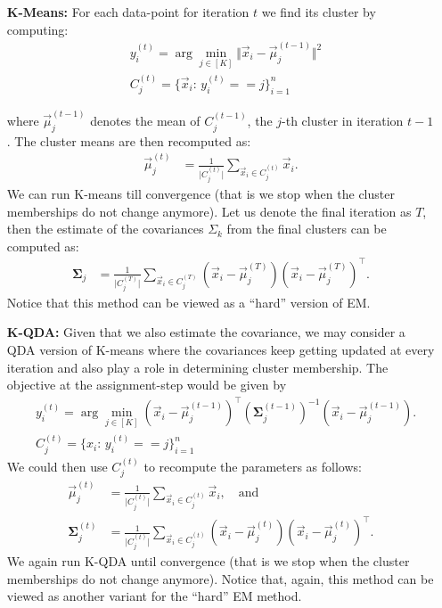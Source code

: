 \documentclass[preview]{standalone}
\begin{document}
\begin{itemize}
  \item[{\bf K-Means:}] For each data-point for iteration $t$ we find its cluster
  by computing:
  \begin{align*}
  	&y_i^{(t)}= \arg\min_{j \in [K]} \Vert \vec x_i -\vec \mu_j^{(t-1)}\Vert^2\\
    &C_j^{(t)} = \{\vec x_i :\, y_i^{(t)}==j\}_{i=1}^n
  \end{align*}

  where $\vec\mu_j^{(t-1)}$ denotes the mean of $C_j^{(t-1)}$, the $j$-th cluster
  in iteration $t-1$.
  The cluster means are then recomputed as:
  \begin{align*}
  	\vec\mu_j^{(t)} &= \frac{1}{\vert C_j^{(t)} \vert}{\sum_{\vec x_i\in C_j^{(t)}}\vec x_i}.
  \end{align*}
  We can run K-means till convergence (that is we stop when the
  cluster memberships do not change anymore).
  Let us denote the final iteration as $T$, then the estimate of the covariances
  $\Sigma_k$ from the final clusters can be computed as:
  \begin{align*}
  	{\bm\Sigma}_j &= \frac{1}{\vert C_j^{(T)} \vert}
    {\sum_{\vec x_i\in C_j^{(T)}}(\vec x_i-\vec \mu_j^{(T)})(\vec x_i-\vec \mu_j^{(T)})^\top}.
  \end{align*}
  Notice that this method can be viewed as a ``hard'' version of
  EM. 
  
  \item[{\bf K-QDA:}] Given that we also estimate the covariance, we
    may consider a QDA version of K-means where the covariances keep
    getting updated at every iteration and also play a role in
    determining cluster membership. The objective at the assignment-step
    would be given by
  \begin{align*}
  		&y_i^{(t)} = \arg\min_{j \in [K]} 	(\vec x_i -\vec \mu_j^{(t-1)})^\top
      ({\bm \Sigma}_j^{(t-1)})^{-1} (\vec x_i -\vec\mu_j^{(t-1)}).\\
      &C_j^{(t)} = \{x_i :\, y_i^{(t)}==j\}_{i=1}^n
  \end{align*}
    We could then  use $C_j^{(t)}$ to recompute the parameters as follows:
  \begin{align*}
  	\vec\mu_j^{(t)} &= \frac{1}{\vert C_j^{(t)} \vert}{\sum_{\vec x_i\in C_j^{(t)}}\vec x_i},\quad\text{and}\\
  	{\bm\Sigma}_j^{(t)} &= \frac{1}{\vert C_j^{(t)} \vert}{\sum_{\vec x_i\in C_j^{(t)}}(\vec x_i-\vec \mu_j^{(t)})(\vec x_i-\vec \mu_j^{(t)})^\top}.
  \end{align*}
  We again run K-QDA until convergence (that is we stop when the
  cluster memberships do not change anymore). Notice that, again, this method
  can be viewed as another variant for the ``hard'' EM method.


\end{itemize}
\end{document}
